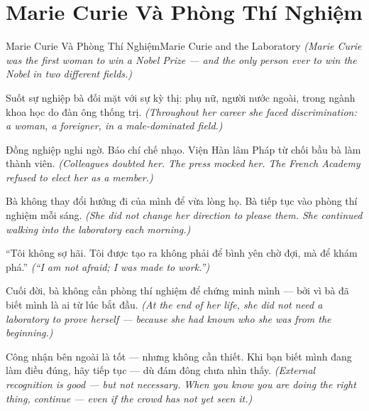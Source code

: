 \section{Marie Curie Và Phòng Thí Nghiệm}
\begin{truyen}{Marie Curie Và Phòng Thí Nghiệm}{Marie Curie and the Laboratory}
\textit{(Marie Curie was the first woman to win a Nobel Prize — and the only person ever to win the Nobel in two different fields.)}

Suốt sự nghiệp bà đối mặt với sự kỳ thị: phụ nữ, người nước ngoài, trong ngành khoa học do đàn ông thống trị.
\textit{(Throughout her career she faced discrimination: a woman, a foreigner, in a male-dominated field.)}

Đồng nghiệp nghi ngờ. Báo chí chế nhạo. Viện Hàn lâm Pháp từ chối bầu bà làm thành viên.
\textit{(Colleagues doubted her. The press mocked her. The French Academy refused to elect her as a member.)}

Bà không thay đổi hướng đi của mình để vừa lòng họ. Bà tiếp tục vào phòng thí nghiệm mỗi sáng.
\textit{(She did not change her direction to please them. She continued walking into the laboratory each morning.)}

``Tôi không sợ hãi. Tôi được tạo ra không phải để bình yên chờ đợi, mà để khám phá.''
\textit{(``I am not afraid; I was made to work.'')}

Cuối đời, bà không cần phòng thí nghiệm để chứng minh mình — bởi vì bà đã biết mình là ai từ lúc bắt đầu.
\textit{(At the end of her life, she did not need a laboratory to prove herself — because she had known who she was from the beginning.)}

\end{truyen}

\begin{baihoc}
Công nhận bên ngoài là tốt — nhưng không cần thiết. Khi bạn biết mình đang làm điều đúng, hãy tiếp tục — dù đám đông chưa nhìn thấy.
\textit{(External recognition is good — but not necessary. When you know you are doing the right thing, continue — even if the crowd has not yet seen it.)}
\end{baihoc}
\ngancach

